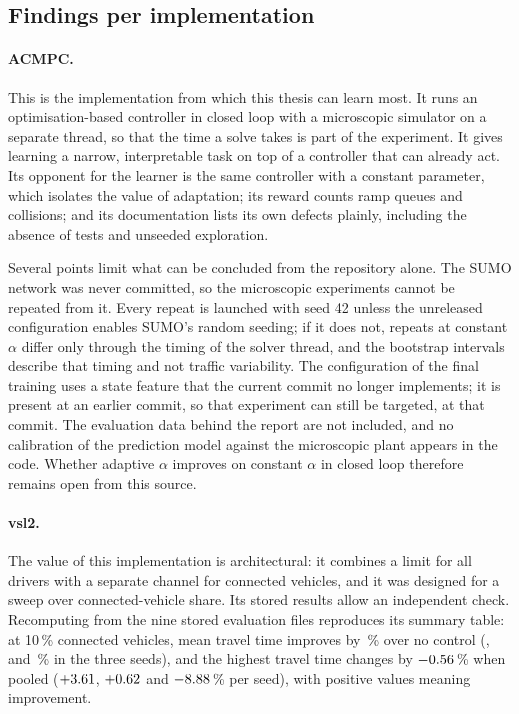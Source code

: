 \subsection{Findings per implementation}\label{sec:open-impl-findings}

\paragraph{ACMPC.}
This is the implementation from which this thesis can learn most. It runs an optimisation-based controller in closed loop with a microscopic simulator on a separate thread, so that the time a solve takes is part of the experiment. It gives learning a narrow, interpretable task on top of a controller that can already act. Its opponent for the learner is the same controller with a constant parameter, which isolates the value of adaptation; its reward counts ramp queues and collisions; and its documentation lists its own defects plainly, including the absence of tests and unseeded exploration.

Several points limit what can be concluded from the repository alone. The SUMO network was never committed, so the microscopic experiments cannot be repeated from it. Every repeat is launched with seed 42 unless the unreleased configuration enables SUMO's random seeding; if it does not, repeats at constant $\alpha$ differ only through the timing of the solver thread, and the bootstrap intervals describe that timing and not traffic variability. The configuration of the final training uses a state feature that the current commit no longer implements; it is present at an earlier commit, so that experiment can still be targeted, at that commit. The evaluation data behind the report are not included, and no calibration of the prediction model against the microscopic plant appears in the code. Whether adaptive $\alpha$ improves on constant $\alpha$ in closed loop therefore remains open from this source.

\paragraph{vsl2.}
The value of this implementation is architectural: it combines a limit for all drivers with a separate channel for connected vehicles, and it was designed for a sweep over connected-vehicle share. Its stored results allow an independent check. Recomputing from the nine stored evaluation files reproduces its summary table: at 10\,\% connected vehicles, mean travel time improves by \OIVslGain{}\,\% over no control (\OIVslSeedA{}, \OIVslSeedB{} and \OIVslSeedC{}\,\% in the three seeds), and the highest travel time changes by $-0.56{}$\,\% when pooled ($+3.61{}$, $+0.62{}$ and $-8.88{}$\,\% per seed), with positive values meaning improvement.

